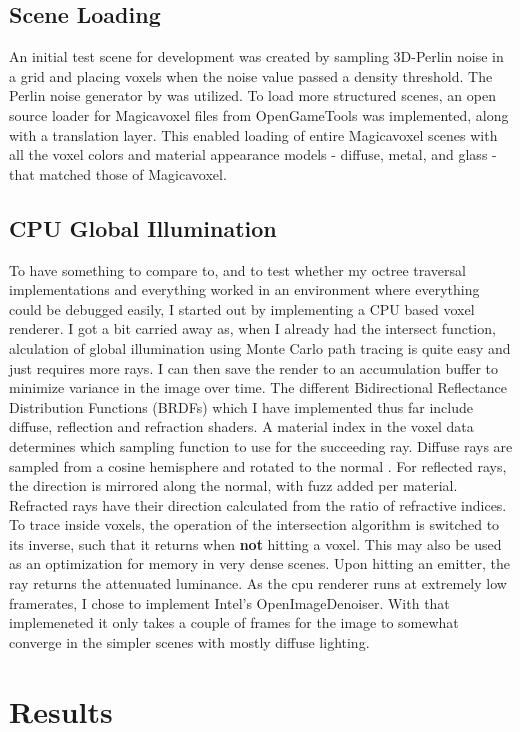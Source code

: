 \subsection*{Scene Loading}
An initial test scene for development was created by sampling 3D-Perlin noise in a grid and placing voxels when the noise value passed a density threshold. The Perlin noise generator by \cite{perlin} was utilized. To load more structured scenes, an open source loader for Magicavoxel files from OpenGameTools \cite{OGT} was implemented, along with a translation layer. This enabled loading of entire Magicavoxel scenes with all the voxel colors and material appearance models - diffuse, metal, and glass - that matched those of Magicavoxel.

\subsection*{CPU Global Illumination}
To have something to compare to, and to test whether my octree traversal implementations and everything worked in an environment where everything could be debugged easily, I started out by implementing a CPU based voxel renderer. I got a bit carried away as, when I already had the intersect function, alculation of global illumination using Monte Carlo path tracing is quite easy and just requires more rays. I can then save the render to an accumulation buffer to minimize variance in the image over time. The different Bidirectional Reflectance Distribution Functions (BRDFs) which I have implemented thus far include diffuse, reflection and refraction shaders. A material index in the voxel data determines which sampling function to use for the succeeding ray. Diffuse rays are sampled from a cosine hemisphere and rotated to the normal \cite{ROTATE}. For reflected rays, the direction is mirrored along the normal, with fuzz added per material. Refracted rays have their direction calculated from the ratio of refractive indices. To trace inside voxels, the operation of the intersection algorithm is switched to its inverse, such that it returns when \textbf{not} hitting a voxel. This may also be used as an optimization for memory in very dense scenes. Upon hitting an emitter, the ray returns the attenuated luminance. As the cpu renderer runs at extremely low framerates, I chose to implement Intel's OpenImageDenoiser. With that implemeneted it only takes a couple of frames for the image to somewhat converge in the simpler scenes with mostly diffuse lighting.

\section{Results}
